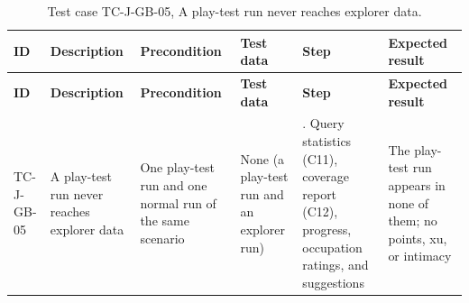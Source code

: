 {\footnotesize{}\renewcommand{\arraystretch}{1.1}
\begin{longtable}{|>{\raggedright\arraybackslash}p{}|>{\raggedright\arraybackslash}p{}|>{\raggedright\arraybackslash}p{}|>{\raggedright\arraybackslash}p{}|>{\raggedright\arraybackslash}p{}|>{\raggedright\arraybackslash}p{}|}
\caption{Test case TC-J-GB-05, A play-test run never reaches explorer data.} \\
\hline
\textbf{ID} & \textbf{Description} & \textbf{Precondition} & \textbf{Test data} & \textbf{Step} & \textbf{Expected result} \\ \hline
\endfirsthead
\hline
\textbf{ID} & \textbf{Description} & \textbf{Precondition} & \textbf{Test data} & \textbf{Step} & \textbf{Expected result} \\ \hline
\endhead
TC-J-GB-05 & A play-test run never reaches explorer data & One play-test run and one normal run of the same scenario & None (a play-test run and an explorer run) & 1. Query statistics (C11), coverage report (C12), progress, occupation ratings, and suggestions & The play-test run appears in none of them; no points, xu, or intimacy \\ \hline
\end{longtable}
}

